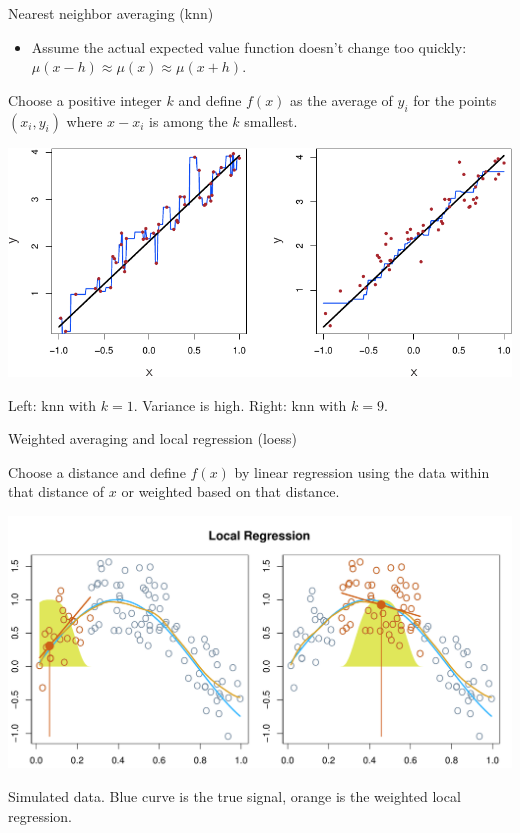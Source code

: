 \documentclass[
  ignorenonframetext,
]{beamer}
\providecommand{\tightlist}{%
  \setlength{\itemsep}{0pt}\setlength{\parskip}{0pt}}
\begin{document}
\begin{frame}{Nearest neighbor averaging (knn)}
\protect\hypertarget{nearest-neighbor-averaging-knn}{}

\begin{itemize}
\tightlist
\item
  Assume the actual expected value function doesn't change too quickly:
  \(\mu(x-h)\approx\mu(x)\approx\mu(x+h)\).
\end{itemize}

Choose a positive integer \(k\) and define \(f(x)\) as the average of
\(y_i\) for the points \((x_i,y_i)\) where \(x-x_i\) is among the \(k\)
smallest.

\includegraphics{../images/knn2.pdf}

Left: knn with \(k=1\). Variance is high. Right: knn with \(k=9\).

\end{frame}

\begin{frame}{Weighted averaging and local regression (loess)}
\protect\hypertarget{weighted-averaging-and-local-regression-loess}{}

Choose a distance and define \(f(x)\) by linear regression using the
data within that distance of \(x\) or weighted based on that distance.

\includegraphics{../images/loess.pdf}

Simulated data. Blue curve is the true signal, orange is the weighted
local regression.

\end{frame}
\end{document}

